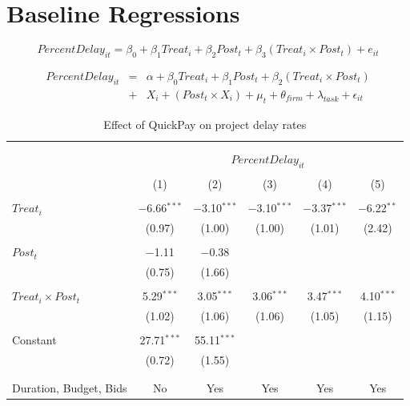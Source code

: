 \documentclass[
]{article}
\begin{document}
\hypertarget{baseline-regressions}{%
\section{Baseline Regressions}\label{baseline-regressions}}

\[ PercentDelay_{it} = \beta_0 + \beta_1 Treat_i + \beta_2 Post_t + \beta_3 (Treat_i \times Post_t) + e_{it}\]

\[ \begin{aligned} PercentDelay_{it} &=& \alpha+\beta_0 Treat_i + \beta_1 Post_t + \beta_2 (Treat_i \times Post_t)\\
&+&  X_i + (Post_t \times X_i) + \mu_t + \theta_{firm} + \lambda_{task}+ \epsilon_{it}
\end{aligned}\]

\begin{table}[H] \centering 
  \caption{Effect of QuickPay on project delay rates} 
  \label{} 
\small 
\begin{tabular}{@{\extracolsep{-2pt}}lccccc} 
\\[-1.8ex]\hline 
\hline \\[-1.8ex] 
\\[-1.8ex] & \multicolumn{5}{c}{$PercentDelay_{it}$} \\ 
\\[-1.8ex] & (1) & (2) & (3) & (4) & (5)\\ 
\hline \\[-1.8ex] 
 $Treat_i$ & $-$6.66$^{***}$ & $-$3.10$^{***}$ & $-$3.10$^{***}$ & $-$3.37$^{***}$ & $-$6.22$^{**}$ \\ 
  & (0.97) & (1.00) & (1.00) & (1.01) & (2.42) \\ 
  & & & & & \\ 
 $Post_t$ & $-$1.11 & $-$0.38 &  &  &  \\ 
  & (0.75) & (1.66) &  &  &  \\ 
  & & & & & \\ 
 $Treat_i \times Post_t$ & 5.29$^{***}$ & 3.05$^{***}$ & 3.06$^{***}$ & 3.47$^{***}$ & 4.10$^{***}$ \\ 
  & (1.02) & (1.06) & (1.06) & (1.05) & (1.15) \\ 
  & & & & & \\ 
 Constant & 27.71$^{***}$ & 55.11$^{***}$ &  &  &  \\ 
  & (0.72) & (1.55) &  &  &  \\ 
  & & & & & \\ 
\hline \\[-1.8ex] 
Duration, Budget, Bids & No & Yes & Yes & Yes & Yes \\ 

\end{tabular}
\end{table}
\end{document}
